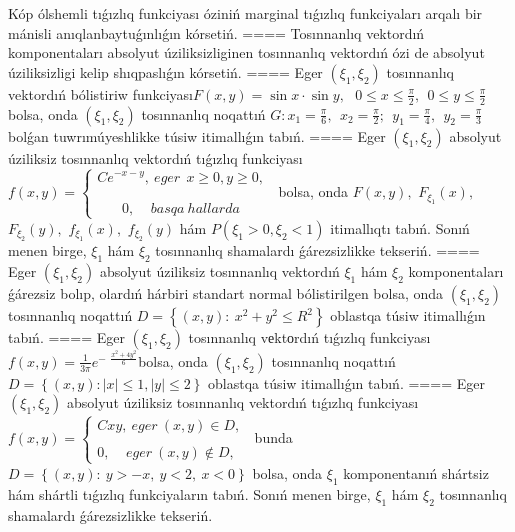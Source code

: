 Kóp ólshemli tıǵızlıq funkciyası óziniń marginal tıǵızlıq funkciyaları arqalı bir mánisli anıqlanbaytuǵınlıǵın kórsetiń.
====
Tosınnanlıq vektordıń komponentaları absolyut úziliksizliginen tosınnanlıq vektordıń ózi de absolyut úziliksizligi kelip shıqpaslıǵın kórsetiń.
====
Eger \(\left( \xi_{1},\xi_{2} \right)\) tosınnanlıq vektordıń bólistiriw funkciyası\(F(x,y) = \sin x \cdot \sin y,\ \ \ 0 \leq x \leq \frac{\pi}{2},\ \ 0 \leq y \leq \frac{\pi}{2}\) bolsa, onda \(\left( \xi_{1},\xi_{2} \right)\) tosınnanlıq noqattıń \(G:x_{1} = \frac{\pi}{6},\ \ x_{2} = \frac{\pi}{2};\ \ y_{1} = \frac{\pi}{4},\ \ y_{2} = \frac{\pi}{3}\) bolǵan tuwrımúyeshlikke túsiw itimallıǵın tabıń.
====
Eger \(\left( \xi_{1},\xi_{2} \right)\) absolyut úziliksiz tosınnanlıq vektordıń tıǵızlıq funkciyası \(f(x,y) = \left\{ \begin{matrix}
Ce^{- x - y},\ eger\ \ x \geq 0,y \geq 0, \\
 \\
 \\
\ \ \ \ \ \ \ \ 0,\ \ \ \ \ basqa\ hallarda\ 
\end{matrix} \right.\ \) bolsa, onda \(F(x,y),\) \(F_{\xi_{1}}(x),\) \(F_{\xi_{2}}(y),\) \(f_{\xi_{1}}(x),\) \(f_{\xi_{2}}(y)\) hám \(P\left( \xi_{1} > 0,\xi_{2} < 1 \right)\) itimallıqtı tabıń. Sonıń menen birge, \(\xi_{1}\) hám \(\xi_{2}\) tosınnanlıq shamalardı ǵárezsizlikke tekseriń.
====
Eger \(\left( \xi_{1},\xi_{2} \right)\) absolyut úziliksiz tosınnanlıq vektordıń \(\xi_{1}\) hám \(\xi_{2}\) komponentaları ǵárezsiz bolıp, olardıń hárbiri standart normal bólistirilgen bolsa, onda \(\left( \xi_{1},\xi_{2} \right)\) tosınnanlıq noqattıń \(D = \left\{ (x,y):\ x^{2} + y^{2} \leq R^{2} \right\}\) oblastqa túsiw itimallıǵın tabıń.
====
Eger \(\left( \xi_{1},\xi_{2} \right)\) tosınnanlıq vеktоrdıń tıǵızlıq funkciyası \(f(x,y) = \frac{1}{3\pi}e^{- \ \ \frac{x^{2} + 4y^{2}}{6}}\)bolsa, onda \(\left( \xi_{1},\xi_{2} \right)\) tosınnanlıq noqattıń \(D = \left\{ (x,y):|x| \leq 1,|y| \leq 2 \right\}\) oblastqa túsiw itimallıǵın tabıń.
====
Eger \(\left( \xi_{1},\xi_{2} \right)\) absolyut úziliksiz tosınnanlıq vektordıń tıǵızlıq funkciyası \(f(x,y) = \left\{ \begin{matrix}
Cxy,\ eger\ (x,y) \in D, \\
 \\
0,\ \ \ \ \ eger\ (x,y) \notin D,
\end{matrix} \right.\ \) bunda \(D = \left\{ (x,y):\ y > - x,\ y < 2,\ x < 0 \right\}\) bolsa, onda \(\xi_{1}\) komponentanıń shártsiz hám shártli tıǵızlıq funkciyaların tabıń. Sonıń menen birge, \(\xi_{1}\) hám \(\xi_{2}\) tosınnanlıq shamalardı ǵárezsizlikke tekseriń.
